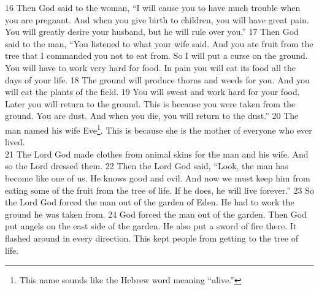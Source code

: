 16 Then God said to the woman, “I will cause you to have much trouble when you are pregnant. And when you give birth to children, you will have great pain. You will greatly desire your husband, but he will rule over you.”
17 Then God said to the man, “You listened to what your wife said. And you ate fruit from the tree that I commanded you not to eat from. So I will put a curse on the ground. You will have to work very hard for food. In pain you will eat its food all the days of your life. 18 The ground will produce thorns and weeds for you. And you will eat the plants of the field. 19 You will sweat and work hard for your food. Later you will return to the ground. This is because you were taken from the ground. You are dust. And when you die, you will return to the dust.” 20 The man named his wife Eve\footnote{This name sounds like the Hebrew word meaning “alive.”}.  This is because she is the mother of everyone who ever lived.\\
21 The Lord God made clothes from animal skins for the man and his wife. And so the Lord dressed them. 22 Then the Lord God said, “Look, the man has become like one of us. He knows good and evil. And now we must keep him from eating some of the fruit from the tree of life. If he does, he will live forever.” 23 So the Lord God forced the man out of the garden of Eden. He had to work the ground he was taken from. 24 God forced the man out of the garden. Then God put angels on the east side of the garden. He also put a sword of fire there. It flashed around in every direction. This kept people from getting to the tree of life.




\newpage
